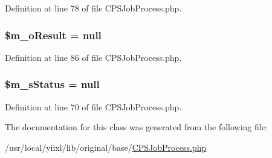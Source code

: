 Definition at line 78 of file CPSJobProcess.php.

\hypertarget{classCPSJobProcess_a4a251a10e160111a73920d784e217fd7}{
\subsubsection[{\$m\_\-oResult}]{\setlength{\rightskip}{0pt plus 5cm}\$m\_\-oResult = null}}
\label{classCPSJobProcess_a4a251a10e160111a73920d784e217fd7}


Definition at line 86 of file CPSJobProcess.php.

\hypertarget{classCPSJobProcess_a59c6d34dc39a2eef90aca02aba384173}{
\subsubsection[{\$m\_\-sStatus}]{\setlength{\rightskip}{0pt plus 5cm}\$m\_\-sStatus = null}}
\label{classCPSJobProcess_a59c6d34dc39a2eef90aca02aba384173}


Definition at line 70 of file CPSJobProcess.php.



The documentation for this class was generated from the following file:\begin{DoxyCompactItemize}
\item 
/usr/local/yiixl/lib/original/base/\hyperlink{CPSJobProcess_8php}{CPSJobProcess.php}\end{DoxyCompactItemize}
